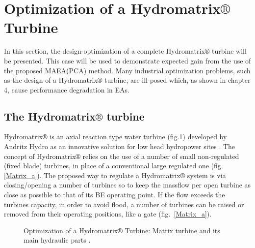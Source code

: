 \clearpage

\section{Optimization of a Hydromatrix$\circledR$ Turbine}
\label{Matrix-case}
In this section, the design-optimization of a complete Hydromatrix$\circledR$ turbine will be presented. This case will be used to demonstrate expected gain from the use of the proposed MAEA(PCA) method. Many industrial optimization problems, such as the design of a  Hydromatrix$\circledR$ turbine, are ill-posed which, as shown in chapter 4, cause performance degradation in EAs.   
\subsection{The Hydromatrix$\circledR$ turbine}
Hydromatrix$\circledR$ is an axial reaction type water turbine (fig.\ref{Matrix_c}) developed by Andritz Hydro as an innovative solution for low head hydropower sites \cite{matrix,matrix_2}. The concept of Hydromatrix$\circledR$ relies on the use of a number of small non-regulated (fixed blade) turbines, in place of a conventional large regulated one (fig.\ref{Matrix_a}).  The proposed way to regulate a Hydromatrix$\circledR$ system is via closing/opening a number of turbines so to keep the massflow per open turbine as close as possible to that of its BE operating point. If the flow exceeds the turbines capacity, in order to avoid flood, a number of turbines can be raised or removed from their operating positions, like a gate (fig.~\ref{Matrix_a}).  


\begin{figure}[h!]
\begin{minipage}[b]{1.0\linewidth}
 \centering
\end{minipage}
\caption{Optimization of a Hydromatrix$\circledR$ Turbine: Matrix turbine and its main hydraulic parts \cite{matrix,matrix_2}. }
\label{Matrix_c}
\end{figure}

